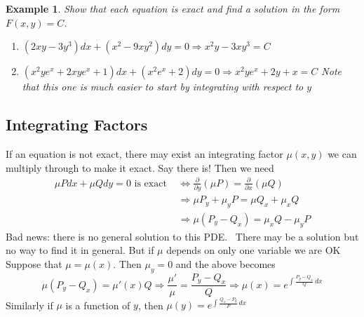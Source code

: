 \documentclass[letterpaper, 11pt, openany]{book}
\newcommand{\pd}[2]{\frac{\partial #1}{\partial #2}}
\theoremstyle{mytheoremstyle}
\theoremstyle{myexamplestyle}
\newtheorem{example}{Example}[section]
\begin{document}
\begin{example}
    Show that each equation is exact and find a solution in the form \(F(x,y) = C\).
    \begin{enumerate}
        \item \(\left(2xy - 3y^{3}\right)dx + \left(x^{2}-9xy^{2}\right)dy = 0 \Rightarrow x^{2}y-3xy^{3} = C\)
        \item \(\left(x^{2}y e^{x} + 2xye^{x} + 1\right)dx + \left(x^{2}e^{x} + 2\right)dy = 0 \Rightarrow x^{2}y e^{x} + 2y + x = C\) Note that this one is much easier to start by integrating with respect to \(y\)
    \end{enumerate}
\end{example}

\subsection{Integrating Factors}
If an equation is not exact, there may exist an integrating factor \(\mu(x,y)\) we can multiply through to make it exact. Say there is! Then we need
\begin{align*}
    \mu P dx + \mu Q dy = 0\text{ is exact }    &\Leftrightarrow \pd{}{y}\left(\mu P\right) = \pd{}{x}\left(\mu Q\right)\\
                                &\Rightarrow \mu P_{y} + \mu_{y} P = \mu Q_{x} + \mu_{x} Q\\
                                &\Rightarrow \mu\left(P_{y} - Q_{x}\right) = \mu_{x}Q - \mu_{y} P
\end{align*}
Bad news: there is no general solution to this PDE. \faFrown \, There may be a solution but no way to find it in general. But if \(\mu\) depends on only one variable we are OK \faSmile \, Suppose that \(\mu = \mu(x)\). Then \(\mu_{y} = 0\) and the above becomes
\[\mu\left(P_{y} - Q_{x}\right) = \mu'(x) Q \Rightarrow \frac{\mu'}{\mu} = \frac{P_{y} - Q_{x}}{Q} \Rightarrow \mu(x) = e^{\int \frac{P_{y} - Q_{x}}{Q} \, dx}\]
Similarly if \(\mu\) is a function of \(y\), then \(\displaystyle \mu(y) = e^{\int \frac{Q_{x} - P_{y}}{P} \, dx}\)
\end{document}
